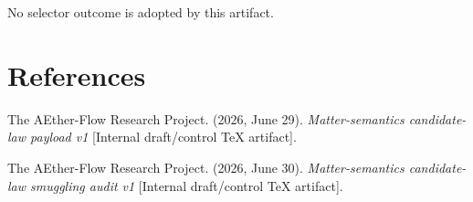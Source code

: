 \documentclass[11pt]{article}
\begin{document}
No selector outcome is adopted by this artifact.

\section{References}

The AEther-Flow Research Project. (2026, June 29). \emph{Matter-semantics
candidate-law payload v1} [Internal draft/control TeX artifact].

The AEther-Flow Research Project. (2026, June 30). \emph{Matter-semantics
candidate-law smuggling audit v1} [Internal draft/control TeX artifact].
\end{document}
